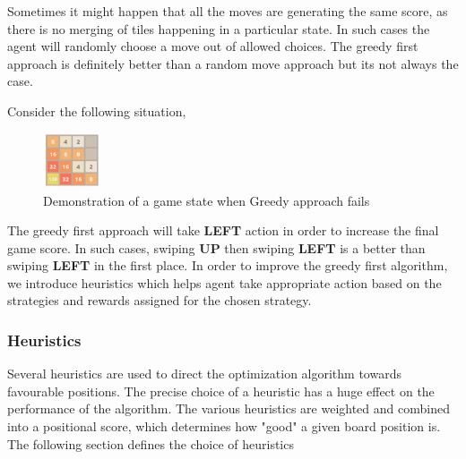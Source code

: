 \documentclass{svproc}
\begin{document}
    Sometimes it might happen that all the moves are generating the same score, as there is no merging of tiles happening in a particular state. In such cases the agent will randomly choose a move out of allowed choices. The greedy first approach is definitely better than a random move approach but its not always the case.

    Consider the following situation,
    \begin{figure}[h!]

        \centering
        \includegraphics[width=0.15\textwidth]{greedy_img_correction.png}
        \caption{Demonstration of a game state when Greedy approach fails}
    \end{figure}

    The greedy first approach will take \textbf{LEFT} action in order to increase the final game score. In such cases, swiping \textbf{UP} then swiping \textbf{LEFT} is a better than swiping \textbf{LEFT} in the first place. In order to improve the greedy first algorithm, we introduce heuristics which helps agent take appropriate action based on the strategies and rewards assigned for the chosen strategy.

    \subsubsection{Heuristics}

    Several heuristics are used to direct the optimization algorithm towards favourable positions. The precise choice of a heuristic has a huge effect on the performance of the algorithm. The various heuristics are weighted and combined into a positional score, which determines how "good" a given board position is. The following section defines the choice of heuristics
\end{document}
